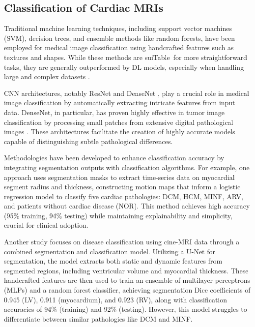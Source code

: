 \documentclass[fleqn,10pt]{wlscirep}
\begin{document}
\subsection*{Classification of Cardiac MRIs}

Traditional machine learning techniques, including support vector machines (SVM), decision trees, and ensemble methods like random forests, have been employed for medical image classification using handcrafted features such as textures and shapes. While these methods are suiTable~for more straightforward tasks, they are generally outperformed by DL models, especially when handling large and complex datasets \cite{Mofrad:2022}.

CNN architectures, notably ResNet \cite{He:2016} and DenseNet \cite{Huang:2017}, play a crucial role in medical image classification by automatically extracting intricate features from input data. DenseNet, in particular, has proven highly effective in tumor image classification by processing small patches from extensive digital pathological images \cite{Mofrad:2022}. These architectures facilitate the creation of highly accurate models capable of distinguishing subtle pathological differences.

Methodologies have been developed to enhance classification accuracy by integrating segmentation outputs with classification algorithms. For example, one approach \cite{Mofrad:2022} uses segmentation masks to extract time-series data on myocardial segment radius and thickness, constructing motion maps that inform a logistic regression model to classify five cardiac pathologies: DCM, HCM, MINF, ARV, and patients without cardiac disease (NOR). This method achieves high accuracy (95\% training, 94\% testing) while maintaining explainability and simplicity, crucial for clinical adoption.

Another study \cite{Isensee:2018} focuses on disease classification using cine-MRI data through a combined segmentation and classification model. Utilizing a U-Net for segmentation, the model extracts both static and dynamic features from segmented regions, including ventricular volume and myocardial thickness. These handcrafted features are then used to train an ensemble of multilayer perceptrons (MLPs) and a random forest classifier, achieving segmentation Dice coefficients of 0.945 (LV), 0.911 (myocardium), and 0.923 (RV), along with classification accuracies of 94\% (training) and 92\% (testing). However, this model struggles to differentiate between similar pathologies like DCM and MINF.
\end{document}

